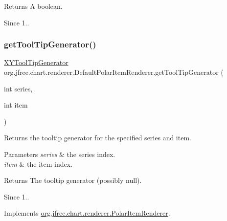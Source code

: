 \begin{DoxyReturn}{Returns}
A boolean.
\end{DoxyReturn}
\begin{DoxySince}{Since}
1.. 
\end{DoxySince}
\mbox{\label{classorg_1_1jfree_1_1chart_1_1renderer_1_1_default_polar_item_renderer_a8cb1713bde0d1ef338294ee530885743}} 
\subsubsection{\texorpdfstring{get\+Tool\+Tip\+Generator()}{getToolTipGenerator()}}
{\footnotesize\ttfamily \mbox{\hyperlink{interfaceorg_1_1jfree_1_1chart_1_1labels_1_1_x_y_tool_tip_generator}{X\+Y\+Tool\+Tip\+Generator}} org.\+jfree.\+chart.\+renderer.\+Default\+Polar\+Item\+Renderer.\+get\+Tool\+Tip\+Generator (\begin{DoxyParamCaption}\item[{int}]{series,  }\item[{int}]{item }\end{DoxyParamCaption})}

Returns the tooltip generator for the specified series and item.


\begin{DoxyParams}{Parameters}
{\em series} & the series index. \\
\hline
{\em item} & the item index.\\
\hline
\end{DoxyParams}
\begin{DoxyReturn}{Returns}
The tooltip generator (possibly {\ttfamily null}).
\end{DoxyReturn}
\begin{DoxySince}{Since}
1.. 
\end{DoxySince}


Implements \mbox{\hyperlink{interfaceorg_1_1jfree_1_1chart_1_1renderer_1_1_polar_item_renderer_a88d1545f3fbb8aaddc89b2afb5ffb050}{org.\+jfree.\+chart.\+renderer.\+Polar\+Item\+Renderer}}.

